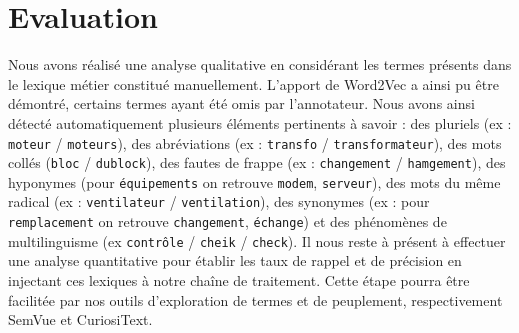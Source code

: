 \section{Evaluation}
Nous avons réalisé une analyse qualitative en considérant les termes présents dans le lexique métier constitué manuellement. L'apport de Word2Vec a ainsi pu être démontré, certains termes ayant été omis par l'annotateur. Nous avons ainsi détecté automatiquement plusieurs éléments pertinents à savoir : des pluriels (ex : \texttt{moteur} / \texttt{moteurs}), des abréviations (ex : \texttt{transfo} / \texttt{transformateur}), des mots collés (\texttt{bloc} / \texttt{dublock}), des fautes de frappe (ex : \texttt{changement} / \texttt{hamgement}), des hyponymes (pour \texttt{équipements} on retrouve \texttt{modem}, \texttt{serveur}), des mots du même radical (ex : \texttt{ventilateur} / \texttt{ventilation}), des synonymes (ex : pour \texttt{remplacement} on retrouve \texttt{changement}, \texttt{échange}) et des phénomènes de multilinguisme (ex \texttt{contrôle} / \texttt{cheik} / \texttt{check}).
Il nous reste à présent à effectuer une analyse quantitative pour établir les taux de rappel et de précision en injectant ces lexiques à notre chaîne de traitement. Cette étape pourra être facilitée par nos outils d’exploration de termes et de peuplement, respectivement SemVue et CuriosiText.
